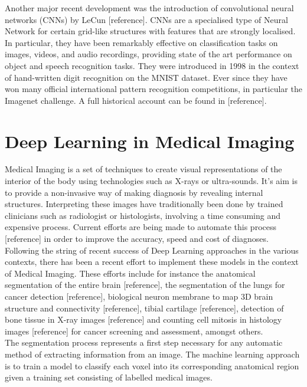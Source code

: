 \noindent Another major recent development was the introduction of convolutional neural networks (CNNs) by LeCun [reference]. CNNs are a specialised type of Neural Network for certain grid-like structures with features that are strongly localised. In particular, they have been remarkably effective on classification tasks on images, videos, and audio recordings, providing state of the art performance on object and speech recognition tasks. They were introduced in 1998 in the context of hand-written digit recognition on the MNIST dataset. Ever since they have won many official international pattern recognition competitions, in particular the Imagenet challenge. A full historical account can be found in [reference].\\

\section{Deep Learning in Medical Imaging}

Medical Imaging is a set of techniques to create visual representations of the interior of the body using technologies such as X-rays or ultra-sounds. It's aim is to provide a non-invasive way of making diagnosis by revealing internal structures. Interpreting these images have traditionally been done by trained clinicians such as radiologist or histologists, involving a time consuming and expensive process. Current efforts are being made to automate this process [reference] in order to improve the accuracy, speed and cost of diagnoses.\\

Following the string of recent success of Deep Learning approaches in the various contexts, there has been a recent effort to implement these models in the context of Medical Imaging. These efforts include for instance the anatomical segmentation of the entire brain [reference], the segmentation of the lungs for cancer detection [reference], biological neuron membrane to map 3D brain structure and connectivity [reference], tibial cartilage [reference], detection of bone tissue in X-ray images [reference] and counting cell mitosis in histology images [reference] for cancer screening and assessment, amongst others.\\

The segmentation process represents a first step necessary for any automatic method of extracting information from an image. The machine learning approach is to train a model to classify each voxel into its corresponding anatomical region given a training set consisting of labelled medical images.\\

